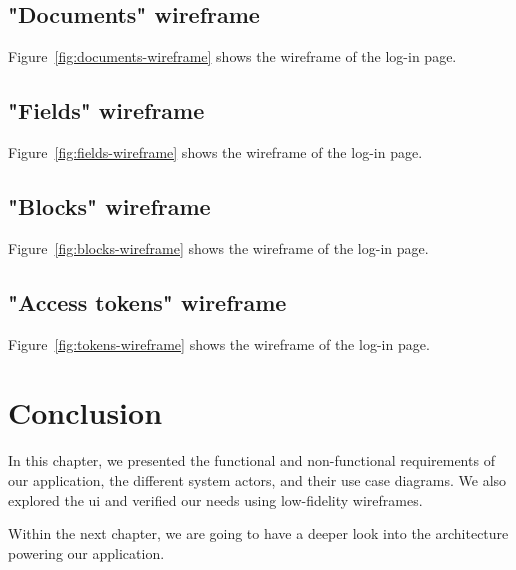 \begin{toexclude}

	\subsection{"Documents" wireframe}
	Figure~\ref{fig:documents-wireframe} shows the wireframe of the log-in page.


	\subsection{"Fields" wireframe}
	Figure~\ref{fig:fields-wireframe} shows the wireframe of the log-in page.


	\subsection{"Blocks" wireframe}
	Figure~\ref{fig:blocks-wireframe} shows the wireframe of the log-in page.


	\subsection{"Access tokens" wireframe}
	Figure~\ref{fig:tokens-wireframe} shows the wireframe of the log-in page.


	\section{Conclusion}

	In this chapter, we presented the functional and non-functional requirements of our application, the different system actors, and their use case diagrams.
	We also explored the \acrlong{ui} and verified our needs using low-fidelity wireframes.

	Within the next chapter, we are going to have a deeper look into the architecture powering our application.

\end{toexclude}
